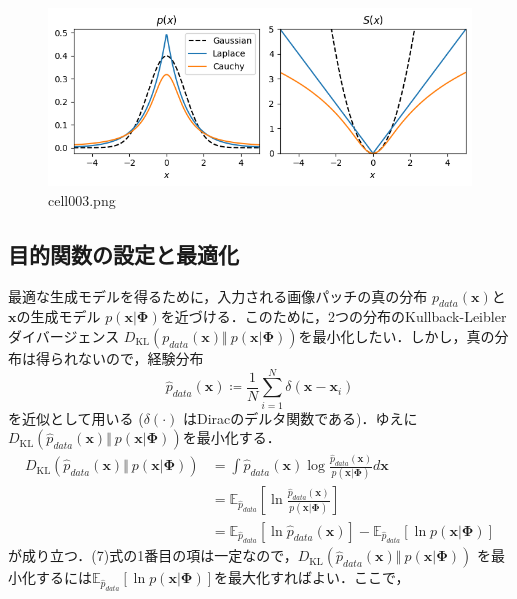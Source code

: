 \begin{figure}[ht]
	\centering
	\includegraphics[scale=0.8, max width=\linewidth]{./fig/energy-based-model/sparse-coding/cell003.png}
	\caption{cell003.png}
	\label{cell003.png}
\end{figure}
\subsection{目的関数の設定と最適化}
最適な生成モデルを得るために，入力される画像パッチの真の分布 $p_{data}(\mathbf{x})$と$\mathbf{x}$の生成モデル $p(\mathbf{x}|\mathbf{\Phi})$を近づける．このために，2つの分布のKullback-Leibler ダイバージェンス $D_{\text{KL}}\left(p_{data}(\mathbf{x}) \Vert\ p(\mathbf{x}|\mathbf{\Phi})\right)$を最小化したい．しかし，真の分布は得られないので，経験分布 
\begin{equation}
\hat{p}_{data}(\mathbf{x})\coloneqq \frac{1}{N}\sum_{i=1}^N \delta(\mathbf{x}-\mathbf{x}_i)
\end{equation}
を近似として用いる ($\delta(\cdot)$ はDiracのデルタ関数である)．ゆえに$D_{\text{KL}}\left(\hat{p}_{data}(\mathbf{x}) \Vert\ p(\mathbf{x}|\mathbf{\Phi})\right)$を最小化する．
\begin{align}
D_{\text{KL}}\left(\hat{p}_{data}(\mathbf{x}) \Vert\ p(\mathbf{x}|\mathbf{\Phi})\right)&=\int \hat{p}_{data}(\mathbf{x}) \log \frac{\hat{p}_{data}(\mathbf{x})}{p(\mathbf{x}|\mathbf{\Phi})} d\mathbf{x}\\
&=\mathbb{E}_{\hat{p}_{data}} \left[\ln \frac{\hat{p}_{data}(\mathbf{x})}{p(\mathbf{x}|\mathbf{\Phi})}\right]\\
&=\mathbb{E}_{\hat{p}_{data}} \left[\ln \hat{p}_{data}(\mathbf{x})\right]-\mathbb{E}_{\hat{p}_{data}} \left[\ln p(\mathbf{x}|\mathbf{\Phi})\right]
\end{align}
が成り立つ．(7)式の1番目の項は一定なので，$D_{\text{KL}}\left(\hat{p}_{data}(\mathbf{x}) \Vert\ p(\mathbf{x}|\mathbf{\Phi})\right)$ を最小化するには$\mathbb{E}_{\hat{p}_{data}} \left[\ln p(\mathbf{x}|\mathbf{\Phi})\right]$を最大化すればよい．ここで，
